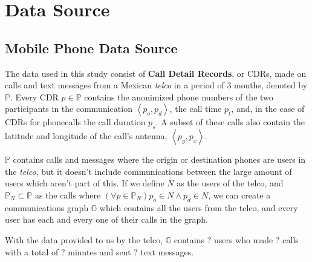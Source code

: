 \section{Data Source}

\subsection{Mobile Phone Data Source}

The data used in this study consist of \textbf{Call Detail Records}, or CDRs, made on calls and text messages from a Mexican \textit{telco} in a period of 3 months, denoted by \( \mathbb{P} \). Every CDR \( p \in \mathbb{P} \)  contains the anonimized phone numbers of the two participants in the communication \( \left< p_o, p_d \right> \), the call time \( p_t \), and, in the case of CDRs for phonecalls the call duration \( p_s \). A subset of these calls also contain the latitude and longitude of the call's antenna, \( \left< p_y, p_x \right> \).

\( \mathbb{P} \) contains calls and messages where the origin or destination phones are users in the \textit{telco}, but it doesn't include communications between the large amount of users which aren't part of this. If we define \( N \) as the users of the telco, and \( \mathbb{P}_N \subset \mathbb{P} \) as the calls where \( \left( \forall p \in \mathbb{P}_N \right) p_o \in N \wedge p_d \in N \), we can create a communications graph \( \mathbb{G} \) which contains all the users from the telco, and every user has each and every one of their calls in the graph.

With the data provided to us by the telco, \( \mathbb{G} \) contains \( ? \) users who made \( ? \) calls with a total of \( ? \) minutes and sent \( ? \) text messages.
